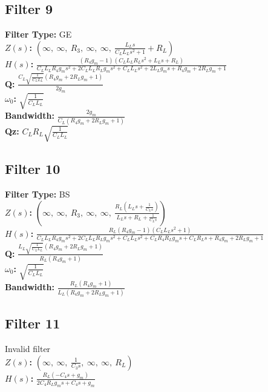 \documentclass{article}
\begin{document}
\subsection*{Filter 9}
\textbf{Filter Type:} GE \\ 
\textbf{$Z(s)$:} $\left( \infty, \  \infty, \  R_{3}, \  \infty, \  \infty, \  \frac{L_{L} s}{C_{L} L_{L} s^{2} + 1} + R_{L}\right)$ \\ 
\textbf{$H(s)$:} $\frac{\left(R_{4} g_{m} - 1\right) \left(C_{L} L_{L} R_{L} s^{2} + L_{L} s + R_{L}\right)}{C_{L} L_{L} R_{4} g_{m} s^{2} + 2 C_{L} L_{L} R_{L} g_{m} s^{2} + C_{L} L_{L} s^{2} + 2 L_{L} g_{m} s + R_{4} g_{m} + 2 R_{L} g_{m} + 1}$ \\ 
\textbf{Q:} $\frac{C_{L} \sqrt{\frac{1}{C_{L} L_{L}}} \left(R_{4} g_{m} + 2 R_{L} g_{m} + 1\right)}{2 g_{m}}$ \\ 
\textbf{$\omega_0$:} $\sqrt{\frac{1}{C_{L} L_{L}}}$ \\ 
\textbf{Bandwidth:} $\frac{2 g_{m}}{C_{L} \left(R_{4} g_{m} + 2 R_{L} g_{m} + 1\right)}$ \\ 
\textbf{Qz:} $C_{L} R_{L} \sqrt{\frac{1}{C_{L} L_{L}}}$ \\ 
\subsection*{Filter 10}
\textbf{Filter Type:} BS \\ 
\textbf{$Z(s)$:} $\left( \infty, \  \infty, \  R_{3}, \  \infty, \  \infty, \  \frac{R_{L} \left(L_{L} s + \frac{1}{C_{L} s}\right)}{L_{L} s + R_{L} + \frac{1}{C_{L} s}}\right)$ \\ 
\textbf{$H(s)$:} $\frac{R_{L} \left(R_{4} g_{m} - 1\right) \left(C_{L} L_{L} s^{2} + 1\right)}{C_{L} L_{L} R_{4} g_{m} s^{2} + 2 C_{L} L_{L} R_{L} g_{m} s^{2} + C_{L} L_{L} s^{2} + C_{L} R_{4} R_{L} g_{m} s + C_{L} R_{L} s + R_{4} g_{m} + 2 R_{L} g_{m} + 1}$ \\ 
\textbf{Q:} $\frac{L_{L} \sqrt{\frac{1}{C_{L} L_{L}}} \left(R_{4} g_{m} + 2 R_{L} g_{m} + 1\right)}{R_{L} \left(R_{4} g_{m} + 1\right)}$ \\ 
\textbf{$\omega_0$:} $\sqrt{\frac{1}{C_{L} L_{L}}}$ \\ 
\textbf{Bandwidth:} $\frac{R_{L} \left(R_{4} g_{m} + 1\right)}{L_{L} \left(R_{4} g_{m} + 2 R_{L} g_{m} + 1\right)}$ \\ 
\subsection*{Filter 11}
Invalid filter \\ 
\textbf{$Z(s)$:} $\left( \infty, \  \infty, \  \frac{1}{C_{3} s}, \  \infty, \  \infty, \  R_{L}\right)$ \\ 
\textbf{$H(s)$:} $\frac{R_{L} \left(- C_{4} s + g_{m}\right)}{2 C_{4} R_{L} g_{m} s + C_{4} s + g_{m}}$ \\ 
\end{document}
